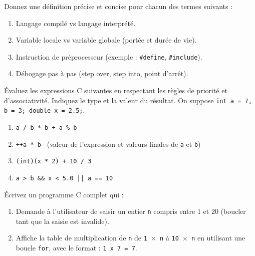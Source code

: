\documentclass[11pt]{article}
\newcounter{popsec}
\newcounter{popsub}
\newcommand{\courssub}[1]{%
  \stepcounter{popsub}%
  \par\vspace{9pt}\noindent{\popxbold\fontsize{11.5}{13}\selectfont\color{popink}{\color{poporange}\thepopsec.\thepopsub}\hspace{6pt}#1}\par\nopagebreak\vspace{4pt}
}
\begin{document}
\begin{exercice}
Donnez une définition précise et concise pour chacun des termes suivants :
\begin{enumerate}
    \item Langage compilé vs langage interprété.
    \item Variable locale vs variable globale (portée et durée de vie).
    \item Instruction de préprocesseur (exemple : \texttt{\#define}, \texttt{\#include}).
    \item Débogage pas à pas (step over, step into, point d'arrêt).
\end{enumerate}
\end{exercice}

\begin{exercice}
Évaluez les expressions C suivantes en respectant les règles de priorité et d'associativité. Indiquez le type et la valeur du résultat. On suppose \texttt{int a = 7, b = 3; double x = 2.5;}.
\begin{enumerate}
    \item \texttt{a / b * b + a \% b}
    \item \texttt{++a * b--} (valeur de l'expression et valeurs finales de \texttt{a} et \texttt{b})
    \item \texttt{(int)(x * 2) + 10 / 3}
    \item \texttt{a > b \&\& x < 5.0 || a == 10}
\end{enumerate}
\end{exercice}

\courssub{Je m'entraîne}

\begin{exercice}
Écrivez un programme C complet qui :
\begin{enumerate}
    \item Demande à l'utilisateur de saisir un entier \texttt{n} compris entre 1 et 20 (boucler tant que la saisie est invalide).
    \item Affiche la table de multiplication de \texttt{n} de \texttt{1 $\times$ n} à \texttt{10 $\times$ n} en utilisant une boucle \texttt{for}, avec le format : \texttt{1 x 7 = 7}.
\end{enumerate}
\end{exercice}
\end{document}

